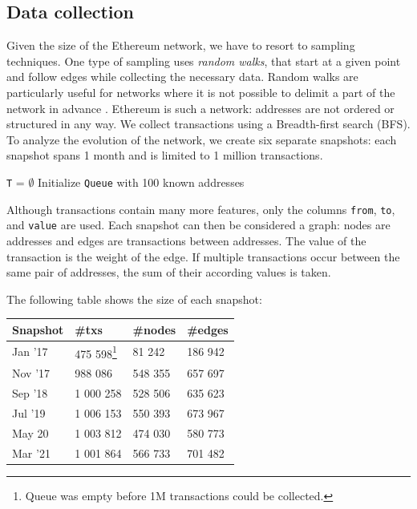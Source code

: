 \documentclass[10pt,a4paper]{article}
\begin{document}
\begin{multicols}{2}
\section{Data collection}
Given the size of the Ethereum network, we have to resort to sampling techniques. One type of sampling uses \textit{random walks}, that start at a given point and follow edges while collecting the necessary data. Random walks are particularly useful for networks where it is not possible to delimit a part of the network in advance \cite{Becchetti06acomparison}. Ethereum is such a network: addresses are not ordered or structured in any way. We collect transactions using a Breadth-first search (BFS). To analyze the evolution of the network, we create six separate snapshots: each snapshot spans 1 month and is limited to 1 million transactions.

\medskip
\begin{algorithm}[H]
\SetAlgoLined
\hspace{5pt}\texttt{T} = $\emptyset$\newline
Initialize \texttt{Queue} with 100 known addresses
\end{algorithm}

Although transactions contain many more features, only the columns \texttt{from}, \texttt{to}, and \texttt{value} are used.
Each snapshot can then be considered a graph: nodes are addresses and edges are transactions between addresses. The value of the transaction is the weight of the edge. If multiple transactions occur between the same pair of addresses, the sum of their according values is taken. 

The following table shows the size of each snapshot:\\
\vspace{5pt}
\bgroup
\def\arraystretch{1.5}
\begin{tabular}{p{}|p{}|p{}|p{}}
\textbf{Snapshot} & \textbf{\#txs} & \textbf{\#nodes} & \textbf{\#edges} \\ 
\hline 
Jan '17 & 475 598\footnote{Queue was empty before 1M transactions could be collected.}& 81 242 & 186 942  \\
Nov '17 & 988 086 & 548 355 & 657 697  \\
Sep '18 & 1 000 258 & 528 506 & 635 623 \\
Jul '19 & 1 006 153 & 550 393 & 673 967 \\
May 20 & 1 003 812 & 474 030 & 580 773 \\
Mar '21 & 1 001 864 & 566 733 & 701 482 \\
\end{tabular}
\egroup


\end{multicols}
\end{document}
